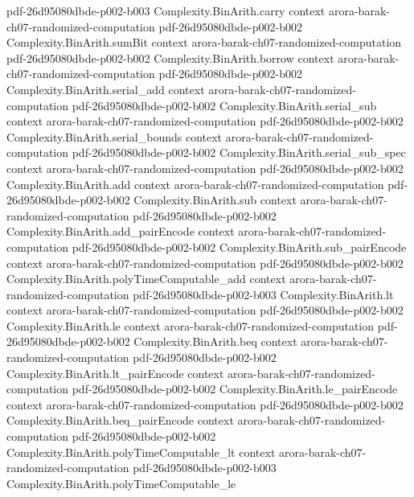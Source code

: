 \begin{theorem}
  {pdf-26d95080dbde-p002-b003}
\proofstep
  {Complexity.BinArith.carry}
  {context}
  {arora-barak-ch07-randomized-computation}
  {pdf-26d95080dbde-p002-b002}
\proofstep
  {Complexity.BinArith.sumBit}
  {context}
  {arora-barak-ch07-randomized-computation}
  {pdf-26d95080dbde-p002-b002}
\proofstep
  {Complexity.BinArith.borrow}
  {context}
  {arora-barak-ch07-randomized-computation}
  {pdf-26d95080dbde-p002-b002}
\proofstep
  {Complexity.BinArith.serial_add}
  {context}
  {arora-barak-ch07-randomized-computation}
  {pdf-26d95080dbde-p002-b002}
\proofstep
  {Complexity.BinArith.serial_sub}
  {context}
  {arora-barak-ch07-randomized-computation}
  {pdf-26d95080dbde-p002-b002}
\proofstep
  {Complexity.BinArith.serial_bounds}
  {context}
  {arora-barak-ch07-randomized-computation}
  {pdf-26d95080dbde-p002-b002}
\proofstep
  {Complexity.BinArith.serial_sub_spec}
  {context}
  {arora-barak-ch07-randomized-computation}
  {pdf-26d95080dbde-p002-b002}
\proofstep
  {Complexity.BinArith.add}
  {context}
  {arora-barak-ch07-randomized-computation}
  {pdf-26d95080dbde-p002-b002}
\proofstep
  {Complexity.BinArith.sub}
  {context}
  {arora-barak-ch07-randomized-computation}
  {pdf-26d95080dbde-p002-b002}
\proofstep
  {Complexity.BinArith.add_pairEncode}
  {context}
  {arora-barak-ch07-randomized-computation}
  {pdf-26d95080dbde-p002-b002}
\proofstep
  {Complexity.BinArith.sub_pairEncode}
  {context}
  {arora-barak-ch07-randomized-computation}
  {pdf-26d95080dbde-p002-b002}
\proofstep
  {Complexity.BinArith.polyTimeComputable_add}
  {context}
  {arora-barak-ch07-randomized-computation}
  {pdf-26d95080dbde-p002-b003}
\proofstep
  {Complexity.BinArith.lt}
  {context}
  {arora-barak-ch07-randomized-computation}
  {pdf-26d95080dbde-p002-b002}
\proofstep
  {Complexity.BinArith.le}
  {context}
  {arora-barak-ch07-randomized-computation}
  {pdf-26d95080dbde-p002-b002}
\proofstep
  {Complexity.BinArith.beq}
  {context}
  {arora-barak-ch07-randomized-computation}
  {pdf-26d95080dbde-p002-b002}
\proofstep
  {Complexity.BinArith.lt_pairEncode}
  {context}
  {arora-barak-ch07-randomized-computation}
  {pdf-26d95080dbde-p002-b002}
\proofstep
  {Complexity.BinArith.le_pairEncode}
  {context}
  {arora-barak-ch07-randomized-computation}
  {pdf-26d95080dbde-p002-b002}
\proofstep
  {Complexity.BinArith.beq_pairEncode}
  {context}
  {arora-barak-ch07-randomized-computation}
  {pdf-26d95080dbde-p002-b002}
\proofstep
  {Complexity.BinArith.polyTimeComputable_lt}
  {context}
  {arora-barak-ch07-randomized-computation}
  {pdf-26d95080dbde-p002-b003}
\proofstep
  {Complexity.BinArith.polyTimeComputable_le}

\end{theorem}
